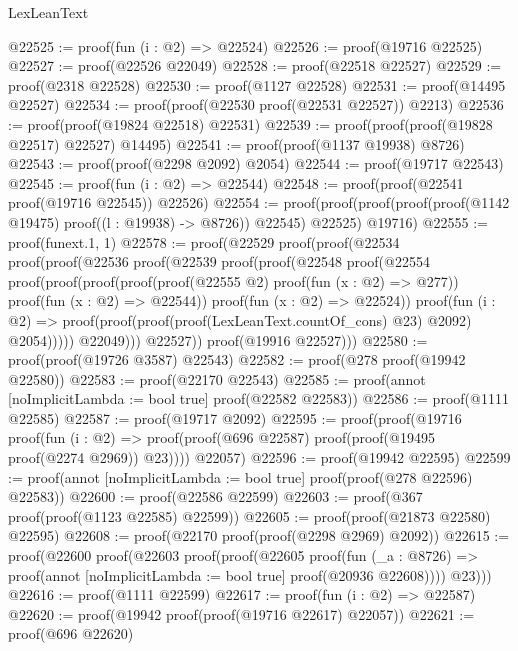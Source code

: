 \begin{lexlean}{LexLeanText}
\begin{coremodule}
@22525 := proof(fun (i : @2) => @22524)
@22526 := proof(@19716 @22525)
@22527 := proof(@22526 @22049)
@22528 := proof(@22518 @22527)
@22529 := proof(@2318 @22528)
@22530 := proof(@1127 @22528)
@22531 := proof(@14495 @22527)
@22534 := proof(proof(@22530 proof(@22531 @22527)) @2213)
@22536 := proof(proof(@19824 @22518) @22531)
@22539 := proof(proof(proof(@19828 @22517) @22527) @14495)
@22541 := proof(proof(@1137 @19938) @8726)
@22543 := proof(proof(@2298 @2092) @2054)
@22544 := proof(@19717 @22543)
@22545 := proof(fun (i : @2) => @22544)
@22548 := proof(proof(@22541 proof(@19716 @22545)) @22526)
@22554 := proof(proof(proof(proof(proof(@1142 @19475) proof((l : @19938) -> @8726)) @22545) @22525)
      @19716)
@22555 := proof(funext.{1, 1})
@22578 := proof(@22529
      proof(proof(@22534
            proof(proof(@22536
                  proof(@22539
                      proof(proof(@22548
                            proof(@22554
                                proof(proof(proof(proof(proof(@22555 @2)
                                          proof(fun (x : @2) => @277))
                                        proof(fun (x : @2) => @22544))
                                      proof(fun (x : @2) => @22524))
                                    proof(fun (i : @2) =>
                                      proof(proof(proof(proof(LexLeanText.countOf_cons) @23) @2092)
                                          @2054)))))
                          @22049)))
                @22527))
          proof(@19916 @22527)))
@22580 := proof(proof(@19726 @3587) @22543)
@22582 := proof(@278 proof(@19942 @22580))
@22583 := proof(@22170 @22543)
@22585 := proof(annot [noImplicitLambda := bool true] proof(@22582 @22583))
@22586 := proof(@1111 @22585)
@22587 := proof(@19717 @2092)
@22595 := proof(proof(@19716
        proof(fun (i : @2) =>
          proof(proof(@696 @22587) proof(proof(@19495 proof(@2274 @2969)) @23))))
      @22057)
@22596 := proof(@19942 @22595)
@22599 := proof(annot [noImplicitLambda := bool true] proof(proof(@278 @22596) @22583))
@22600 := proof(@22586 @22599)
@22603 := proof(@367 proof(proof(@1123 @22585) @22599))
@22605 := proof(proof(@21873 @22580) @22595)
@22608 := proof(@22170 proof(proof(@2298 @2969) @2092))
@22615 := proof(@22600
      proof(@22603
          proof(proof(@22605
                proof(fun (_a : @8726) =>
                  proof(annot [noImplicitLambda := bool true] proof(@20936 @22608))))
              @23)))
@22616 := proof(@1111 @22599)
@22617 := proof(fun (i : @2) => @22587)
@22620 := proof(@19942 proof(proof(@19716 @22617) @22057))
@22621 := proof(@696 @22620)

\end{coremodule}
\end{lexlean}
